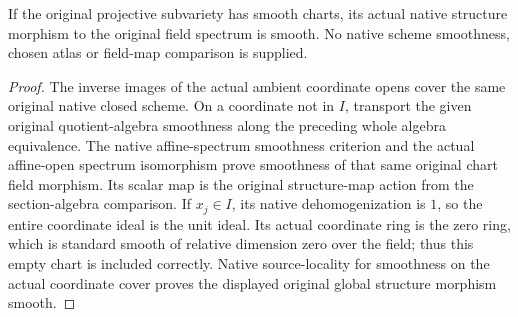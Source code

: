 \begin{theorem}
\label{thm:c0n-original-native-variety-smooth}
\leanok
{}
If the original projective subvariety has smooth charts, its actual
native structure morphism to the original field spectrum is smooth.
No native scheme smoothness, chosen atlas or field-map comparison is
supplied.
\end{theorem}
\begin{proof}
The inverse images of the actual ambient coordinate opens cover the
same original native closed scheme. On a coordinate not in $I$, transport
the given original quotient-algebra smoothness along the preceding whole
algebra equivalence. The native affine-spectrum smoothness criterion and
the actual affine-open spectrum isomorphism prove smoothness of that
same original chart field morphism. Its scalar map is the original
structure-map action from the section-algebra comparison. If $x_j\in I$,
its native dehomogenization is $1$, so the entire coordinate ideal is the
unit ideal. Its actual coordinate ring is the zero ring, which is
standard smooth of relative dimension zero over the field; thus this
empty chart is included correctly. Native source-locality for smoothness
on the actual coordinate cover proves the displayed original global
structure morphism smooth.
\end{proof}

